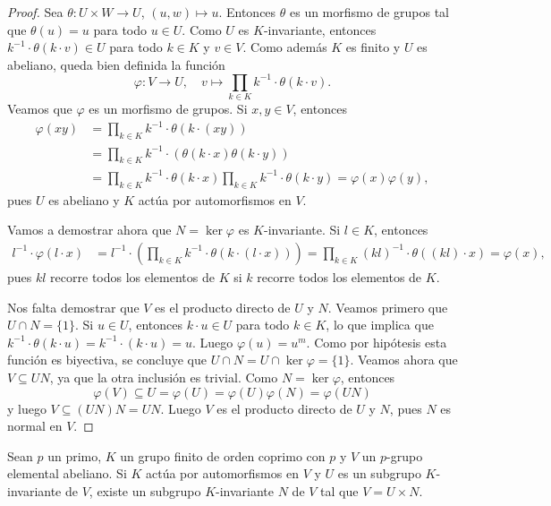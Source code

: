 \begin{proof}
Sea $\theta\colon U\times W\to U$, $(u,w)\mapsto u$. Entonces $\theta$ es un morfismo de grupos tal que 
$\theta(u)=u$ para todo $u\in U$. Como $U$ es $K$-invariante, entonces
$k^{-1}\cdot \theta(k\cdot v)\in U$ para todo $k\in K$ y $v\in V$. 
Como además $K$ es finito y $U$ es abeliano, 
queda bien definida la función
\[
\varphi\colon V\to U,\quad 
v\mapsto \prod_{k\in K}k^{-1}\cdot \theta(k\cdot v).
\]
Veamos que $\varphi$ es un morfismo de grupos. Si $x,y\in V$, entonces
\begin{align*}
    \varphi(xy) &= \prod_{k\in K}k^{-1}\cdot \theta(k\cdot (xy))\\
    &= \prod_{k\in K}k^{-1}\cdot (\theta(k\cdot x)\theta(k\cdot y))\\
    &= \prod_{k\in K}k^{-1}\cdot \theta(k\cdot x) \prod_{k\in K}k^{-1}\cdot \theta(k\cdot y)=\varphi(x)\varphi(y),
\end{align*}
pues $U$ es abeliano y $K$ actúa por automorfismos en $V$. 

Vamos a demostrar ahora que $N=\ker\varphi$ es $K$-invariante. Si $l\in K$, entonces
\begin{align*}
l^{-1}\cdot\varphi(l\cdot x)&=l^{-1}\cdot\left(\prod_{k\in K}k^{-1}\cdot \theta(k\cdot (l\cdot x))\right)=\prod_{k\in K}(kl)^{-1}\cdot\theta( (kl)\cdot x)=\varphi(x),
\end{align*}
pues $kl$ recorre todos los elementos de $K$ si $k$ recorre todos los elementos de $K$.

Nos falta demostrar que $V$ es el producto directo de $U$ y $N$. 
Veamos primero que $U\cap N=\{1\}$. Si $u\in U$, entonces $k\cdot u\in U$ para todo $k\in K$, lo 
que implica que $k^{-1}\cdot\theta(k\cdot u)=k^{-1}\cdot (k\cdot u)=u$. Luego $\varphi(u)=u^m$. Como por hipótesis 
esta función es biyectiva, se concluye que $U\cap N=U\cap\ker\varphi=\{1\}$. Veamos ahora que $V\subseteq UN$, ya que
la otra inclusión es trivial. Como $N=\ker\varphi$, entonces 
\[
\varphi(V)\subseteq U=\varphi(U)=\varphi(U)\varphi(N)=\varphi(UN) 
\]
y luego $V\subseteq (UN)N=UN$. 
Luego $V$ es el producto directo de $U$ y $N$, pues $N$ es normal en $V$.
\end{proof}

\begin{corollary}
    Sean $p$ un primo, $K$ un grupo finito de orden coprimo con $p$ y $V$ un $p$-grupo elemental abeliano. 
    Si $K$ actúa por automorfismos en $V$ y $U$ es un subgrupo $K$-invariante de $V$, 
    existe un subgrupo $K$-invariante $N$ de $V$ tal que $V=U\times N$.
\end{corollary}

